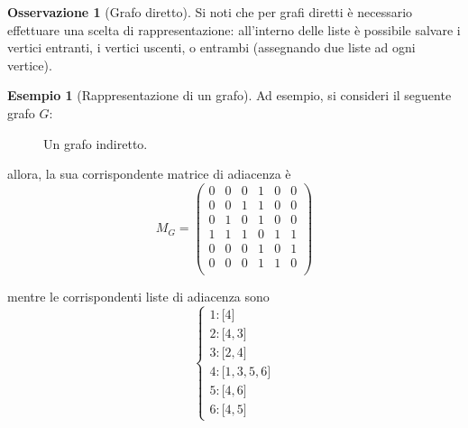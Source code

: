 \documentclass[14pt]{extreport}
\theoremstyle{definition}
\theoremstyle{definition}
\newtheorem{remark}{Osservazione}[subsection]
\newtheorem{example}{Esempio}[subsection]
\begin{document}
\begin{remark}[Grafo diretto]
    Si noti che per grafi diretti è necessario effettuare una scelta di rappresentazione: all'interno delle liste è possibile salvare i vertici entranti, i vertici uscenti, o entrambi (assegnando due liste ad ogni vertice).
\end{remark}

\begin{example}[Rappresentazione di un grafo]
    Ad esempio, si consideri il seguente grafo $G$:

    \begin{figure}[H]
        \centering
        \caption{Un grafo indiretto.}
    \end{figure}

    allora, la sua corrispondente matrice di adiacenza è
    $$M_G = \left( \begin{array}{llllll}
        0 & 0 & 0 & 1 & 0 & 0 \\
        0 & 0 & 1 & 1 & 0 & 0 \\
        0 & 1 & 0 & 1 & 0 & 0 \\
        1 & 1 & 1 & 0 & 1 & 1 \\
        0 & 0 & 0 & 1 & 0 & 1 \\
        0 & 0 & 0 & 1 & 1 & 0 \\
    \end{array} \right)$$

    mentre le corrispondenti liste di adiacenza sono $$\left \{ \begin{array}{l} 1: \texttt{[}4\texttt{]} \\ 2: \texttt{[}4, 3\texttt{]} \\ 3: \texttt{[}2, 4\texttt{]} \\ 4: \texttt{[}1, 3, 5, 6\texttt{]} \\ 5: \texttt{[}4, 6\texttt{]} \\ 6: \texttt{[}4, 5\texttt{]} \end{array} \right.$$
\end{example}
\end{document}
